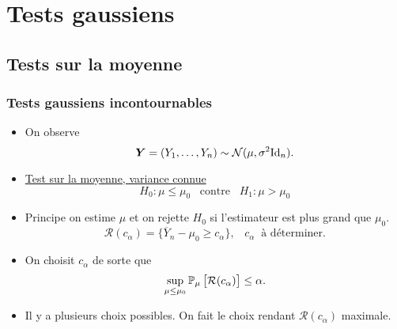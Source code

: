 \section{Tests gaussiens}

\subsection{Tests sur la moyenne}

\begin{frame}
\frametitle{Tests gaussiens incontournables}
\begin{itemize}
\item On observe
$$\operatorname{\boldsymbol{Y}}=(Y_1,\ldots, Y_n) \sim {\mathcal N}(\mu, \sigma^2 \text{Id}_n).$$
\item \underline{\alert{Test sur la moyenne, variance connue}}
$$H_0:\mu \leq \mu_0\;\;\;\text{contre}\;\;\;H_1:\mu > \mu_0$$
\item \alert{ Principe} on estime $\mu$ et on rejette $H_0$ si l'estimateur est  plus grand  que $\mu_0$.
$${\mathcal R}(c_\alpha) = \big\{\overline{Y}_n - \mu_0 \geq c_\alpha\big\},\;\;\;c_\alpha\;\;\text{à déterminer}.$$
\item On choisit $c_\alpha$ de sorte que
$$\sup_{\mu \leq \mu_0}\operatorname{{\mathbb P}}_\mu\big[{\mathcal R}(c_\alpha)\big] \leq \alpha.$$
\item Il y a \alert{plusieurs choix possibles}. On fait le choix rendant  ${\mathcal R}(c_\alpha)$ \alert{  maximale}.
\end{itemize}
\end{frame}

